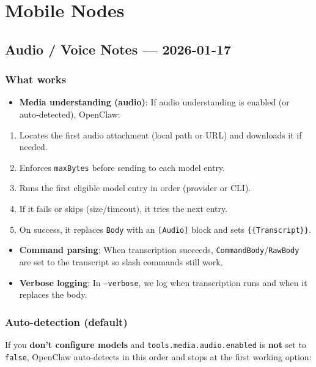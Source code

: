 \chapter{Mobile Nodes}

\section{Audio / Voice Notes — 2026-01-17}


\subsection{What works}


\begin{itemize}
  \item \textbf{Media understanding (audio)}: If audio understanding is enabled (or auto‑detected), OpenClaw:
\end{itemize}

\begin{enumerate}
  \item Locates the first audio attachment (local path or URL) and downloads it if needed.
  \item Enforces \texttt{maxBytes} before sending to each model entry.
  \item Runs the first eligible model entry in order (provider or CLI).
  \item If it fails or skips (size/timeout), it tries the next entry.
  \item On success, it replaces \texttt{Body} with an \texttt{[Audio]} block and sets \texttt{\{\{Transcript\}\}}.
\end{enumerate}

\begin{itemize}
  \item \textbf{Command parsing}: When transcription succeeds, \texttt{CommandBody}/\texttt{RawBody} are set to the transcript so slash commands still work.
  \item \textbf{Verbose logging}: In \texttt{--verbose}, we log when transcription runs and when it replaces the body.
\end{itemize}


\subsection{Auto-detection (default)}


If you \textbf{don’t configure models} and \texttt{tools.media.audio.enabled} is \textbf{not} set to \texttt{false},
OpenClaw auto-detects in this order and stops at the first working option:

